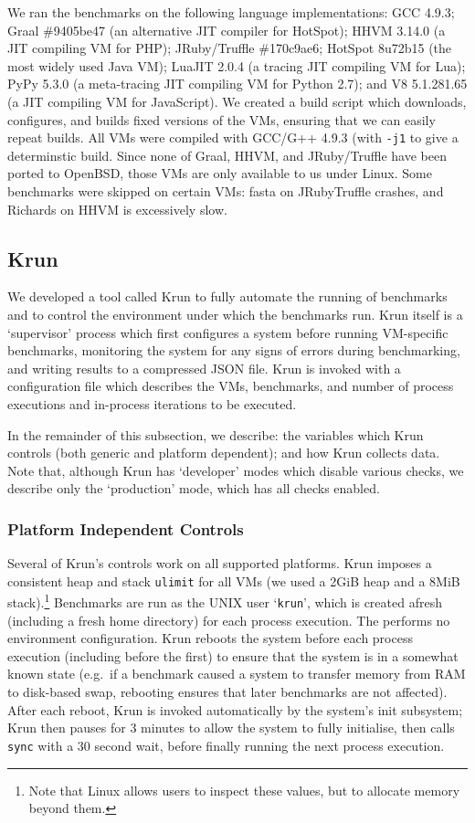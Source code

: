 \documentclass[preprint,numbers,10pt]{sigplanconf}
\newcommand{\krun}{Krun\xspace}
\begin{document}
We ran the benchmarks on the following language implementations: GCC 4.9.3;
Graal \#9405be47 (an alternative JIT compiler for HotSpot); HHVM 3.14.0 (a JIT
compiling VM for PHP); JRuby/Truffle \#170c9ae6; HotSpot 8u72b15 (the most widely used Java
VM); LuaJIT 2.0.4 (a tracing JIT compiling VM for Lua); PyPy 5.3.0 (a
meta-tracing JIT compiling VM for Python 2.7); and V8 5.1.281.65 (a JIT
compiling VM for JavaScript). We created a build script which downloads,
configures, and builds fixed versions of the VMs, ensuring that we can easily
repeat builds. All VMs were compiled with GCC/G++ 4.9.3 (with \texttt{-j1} to
give a determinstic build. Since none of Graal,
HHVM, and JRuby/Truffle have been ported to OpenBSD, those VMs are only
available to us under Linux. Some benchmarks were skipped on certain VMs:
fasta on JRubyTruffle crashes, and Richards on HHVM is excessively slow.


\subsection{\krun}
\label{krun}

We developed a tool called \krun to fully automate the running of benchmarks
and to control the environment under which the benchmarks run. \krun itself is a
`supervisor' process which first configures a system before running VM-specific
benchmarks, monitoring the system for any signs of errors during benchmarking,
and writing results to a compressed JSON file. \krun is invoked with a
configuration file which describes the VMs, benchmarks, and number of process
executions and in-process iterations to
be executed.

In the remainder of this subsection, we describe: the variables which \krun
controls (both generic and platform dependent); and how \krun collects data.
Note that, although \krun has `developer' modes which disable various checks,
we describe only the `production' mode, which has all checks enabled.


\subsubsection{Platform Independent Controls}

Several of \krun's controls work on all supported platforms. \krun imposes a
consistent heap and stack \texttt{ulimit} for all
VMs (we used a 2GiB heap and a 8MiB stack).\footnote{Note that Linux allows users
to inspect these values, but to allocate memory beyond them.} Benchmarks are run
as the UNIX user `\texttt{krun}', which is created afresh (including a fresh
home directory) for each process execution. The performs no environment
configuration.
\krun reboots the system before each process execution (including
before the first) to ensure that the system is in a somewhat known state
(e.g.~if a benchmark caused a system to transfer memory from RAM to disk-based swap,
rebooting ensures that later benchmarks are not affected). After each reboot, \krun
is invoked automatically by the system's init subsystem; \krun then pauses for
3 minutes to allow the system to fully initialise, then calls \texttt{sync}
with a 30 second wait, before finally running the next process execution.
\end{document}
